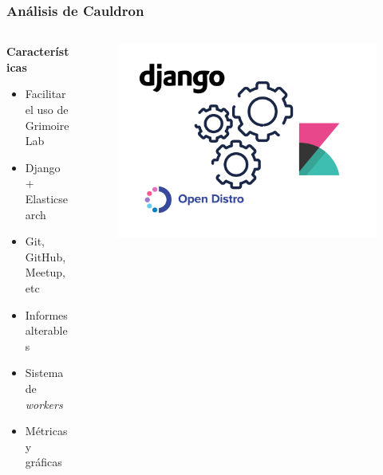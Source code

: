 \documentclass[
	11pt, %
	aspectratio=169, %
]{beamer}
\begin{document}
\begin{frame}
	\frametitle{Análisis de Cauldron}

	\begin{columns}[c] %
		\begin{column}{0.45\textwidth} %
			\textbf{Características}
			\begin{itemize}
				\item Facilitar el uso de GrimoireLab
				\item Django + Elasticsearch
				\item Git, GitHub, Meetup, etc
				\item Informes alterables
				\item Sistema de \emph{workers}
				\item Métricas y gráficas
			\end{itemize}
		\end{column}
		\begin{column}{0.55\textwidth} %
			\begin{figure}
				\includegraphics[width=\linewidth]{cauldron_tools.pdf}
			\end{figure}
		\end{column}
	\end{columns}
\end{frame}

\end{document}
